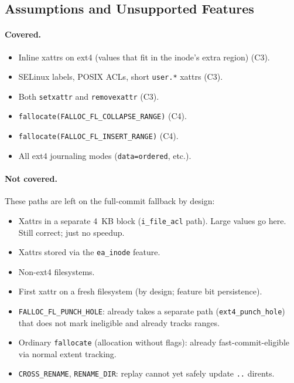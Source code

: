 \documentclass[11pt,a4paper]{article}
\begin{document}
\subsection{Assumptions and Unsupported Features}

\paragraph{Covered.}
\begin{itemize}[leftmargin=*]
  \item Inline xattrs on ext4 (values that fit in the inode's
        extra region) (C3).
  \item SELinux labels, POSIX ACLs, short \texttt{user.*} xattrs
        (C3).
  \item Both \texttt{setxattr} and \texttt{removexattr} (C3).
  \item \texttt{fallocate(FALLOC\_FL\_COLLAPSE\_RANGE)} (C4).
  \item \texttt{fallocate(FALLOC\_FL\_INSERT\_RANGE)} (C4).
  \item All ext4 journaling modes (\texttt{data=ordered}, etc.).
\end{itemize}

\paragraph{Not covered.} These paths are left on the full-commit
fallback by design:
\begin{itemize}[leftmargin=*]
  \item Xattrs in a separate 4~KB block (\texttt{i\_file\_acl} path).
        Large values go here. Still correct; just no speedup.
  \item Xattrs stored via the \texttt{ea\_inode} feature.
  \item Non-ext4 filesystems.
  \item First xattr on a fresh filesystem (by design; feature bit
        persistence).
  \item \texttt{FALLOC\_FL\_PUNCH\_HOLE}: already takes a
        separate path (\texttt{ext4\_punch\_hole}) that does not
        mark ineligible and already tracks ranges.
  \item Ordinary \texttt{fallocate} (allocation without flags):
        already fast-commit-eligible via normal extent tracking.
  \item \texttt{CROSS\_RENAME}, \texttt{RENAME\_DIR}: replay
        cannot yet safely update \texttt{..} dirents.
\end{itemize}
\end{document}
